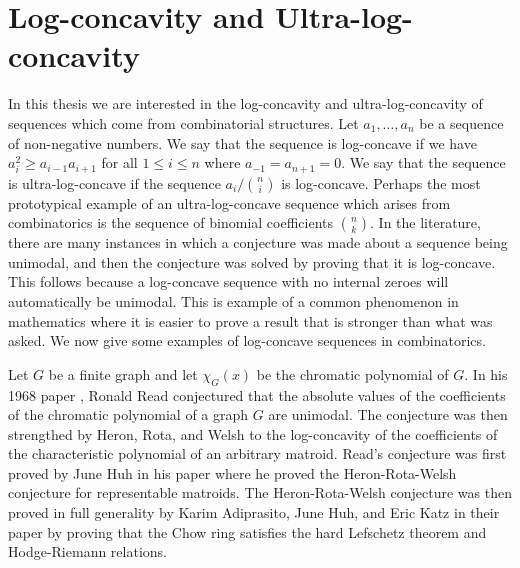 \documentclass{puthesis-UG}
\begin{document}
\section{Log-concavity and Ultra-log-concavity}

In this thesis we are interested in the log-concavity and ultra-log-concavity of sequences which come from combinatorial structures. Let $a_1, \ldots, a_n$ be a sequence of non-negative numbers. We say that the sequence is log-concave if we have $a_i^2 \geq a_{i-1} a_{i+1}$ for all $1 \leq i \leq n$ where $a_{-1} = a_{n+1} = 0$. We say that the sequence is ultra-log-concave if the sequence $a_i / \binom{n}{i}$ is log-concave. Perhaps the most prototypical example of an ultra-log-concave sequence which arises from combinatorics is the sequence of binomial coefficients $\binom{n}{k}$. In the literature, there are many instances in which a conjecture was made about a sequence being unimodal, and then the conjecture was solved by proving that it is log-concave. This follows because a log-concave sequence with no internal zeroes will automatically be unimodal. This is example of a common phenomenon in mathematics where it is easier to prove a result that is stronger than what was asked. We now give some examples of log-concave sequences in combinatorics.

\begin{example}
	Let $G$ be a finite graph and let $\chi_G(x)$ be the chromatic polynomial of $G$. In his 1968 paper \cite{Read-conjecture}, Ronald Read conjectured that the absolute values of the coefficients of the chromatic polynomial of a graph $G$ are unimodal. The conjecture was then strengthed by Heron, Rota, and Welsh to the log-concavity of the coefficients of the characteristic polynomial of an arbitrary matroid. Read's conjecture was first proved by June Huh in his paper \cite{milnor-numbers} where he proved the Heron-Rota-Welsh conjecture for representable matroids. The Heron-Rota-Welsh conjecture was then proved in full generality by Karim Adiprasito, June Huh, and Eric Katz in their paper \cite{AHK} by proving that the Chow ring satisfies the hard Lefschetz theorem and Hodge-Riemann relations. 
\end{example}
\end{document}
